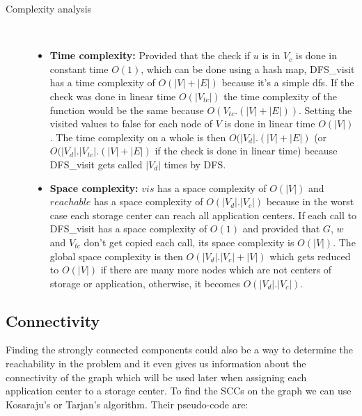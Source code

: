 \documentclass{article}
\begin{document}
\begin{description}
\item[Complexity analysis]\
\begin{itemize}
    \item \textbf{Time complexity:} Provided that the check if $u$ is in $V_c$ is done in constant time $O(1)$, which can be done using a hash map, DFS\_visit has a time complexity of $O(|V|+|E|)$ because it's a simple dfs. If the check was done in linear time $O(|V_{tc}|)$ the time complexity of the function would be the same because $O(V_{tc}.(|V|+|E|))$. Setting the visited values to false for each node of $V$ is done in linear time $O(|V|)$. The time complexity on a whole is then $O(|V_d|.(|V|+|E|)$ (or $O(|V_d|.|V_{tc}|.(|V|+|E|)$ if the check is done in linear time) because DFS\_visit gets called $|V_d|$ times by DFS.
    \item \textbf{Space complexity:} $vis$ has a space complexity of $O(|V|)$ and $reachable$ has a space complexity of $O(|V_d|.|V_c|)$ because in the worst case each storage center can reach all application centers. If each call to DFS\_visit has a space complexity of $O(1)$ and provided that $G$, $w$ and $V_{tc}$ don't get copied each call, its space complexity is $O(|V|)$. The global space complexity is then $O(|V_d|.|V_c|+|V|)$ which gets reduced to $O(|V|)$ if there are many more nodes which are not centers of storage or application, otherwise, it becomes $O(|V_d|.|V_c|)$.
\end{itemize}
\end{description}
\newpage
\subsection{Connectivity}
Finding the strongly connected components could also be a way to determine the reachability in the problem and it even gives us information about the connectivity of the graph which will be used later when assigning each application center to a storage center. To find the SCCs on the graph we can use Kosaraju's or Tarjan's algorithm. Their pseudo-code are: 
\end{document}
